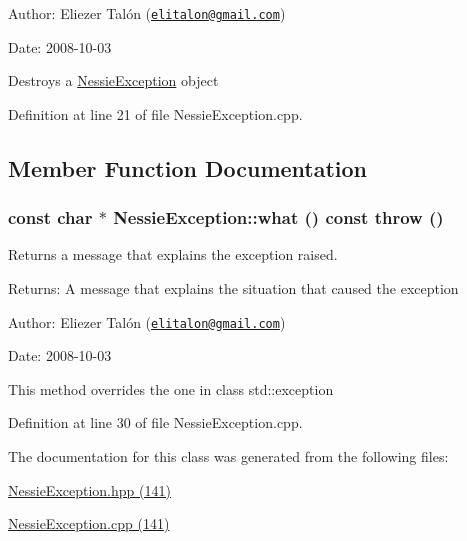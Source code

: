 \begin{Desc}
\item[Author:]Eliezer Talón (\href{mailto:elitalon@gmail.com}{\tt elitalon@gmail.com}) \end{Desc}
\begin{Desc}
\item[Date:]2008-10-03\end{Desc}
Destroys a \hyperlink{class_nessie_exception}{NessieException} object 

Definition at line 21 of file NessieException.cpp.

\subsection{Member Function Documentation}
\hypertarget{class_nessie_exception_a522c2ea164e88be0b26670170b33909}{
\subsubsection[what]{\setlength{\rightskip}{0pt plus 5cm}const char $\ast$ NessieException::what () const  throw ()}}
\label{class_nessie_exception_a522c2ea164e88be0b26670170b33909}


Returns a message that explains the exception raised. 

\begin{Desc}
\item[Returns:]A message that explains the situation that caused the exception\end{Desc}
\begin{Desc}
\item[Author:]Eliezer Talón (\href{mailto:elitalon@gmail.com}{\tt elitalon@gmail.com}) \end{Desc}
\begin{Desc}
\item[Date:]2008-10-03\end{Desc}
This method overrides the one in class std::exception 

Definition at line 30 of file NessieException.cpp.

The documentation for this class was generated from the following files:\begin{CompactItemize}
\item 
\hyperlink{_nessie_exception_8hpp}{NessieException.hpp (141)}\item 
\hyperlink{_nessie_exception_8cpp}{NessieException.cpp (141)}\end{CompactItemize}
